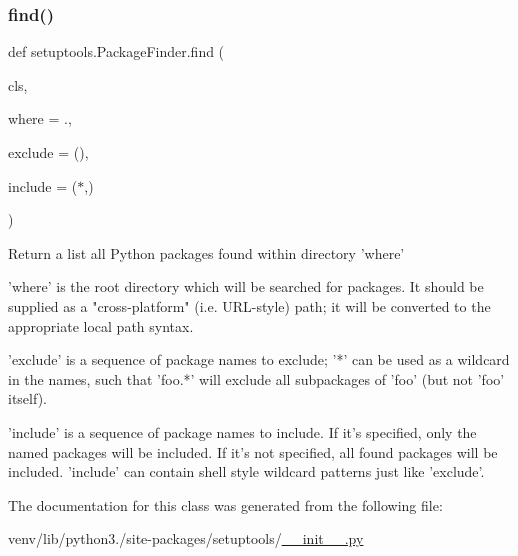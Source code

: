 \subsubsection{\texorpdfstring{find()}{find()}}
{\footnotesize\ttfamily def setuptools.\+Package\+Finder.\+find (\begin{DoxyParamCaption}\item[{}]{cls,  }\item[{}]{where = {\ttfamily \textquotesingle{}.\textquotesingle{}},  }\item[{}]{exclude = {\ttfamily ()},  }\item[{}]{include = {\ttfamily (\textquotesingle{}$\ast$\textquotesingle{},)} }\end{DoxyParamCaption})}

\begin{DoxyVerb}Return a list all Python packages found within directory 'where'

'where' is the root directory which will be searched for packages.  It
should be supplied as a "cross-platform" (i.e. URL-style) path; it will
be converted to the appropriate local path syntax.

'exclude' is a sequence of package names to exclude; '*' can be used
as a wildcard in the names, such that 'foo.*' will exclude all
subpackages of 'foo' (but not 'foo' itself).

'include' is a sequence of package names to include.  If it's
specified, only the named packages will be included.  If it's not
specified, all found packages will be included.  'include' can contain
shell style wildcard patterns just like 'exclude'.
\end{DoxyVerb}
 

The documentation for this class was generated from the following file\+:\begin{DoxyCompactItemize}
\item 
venv/lib/python3./site-\/packages/setuptools/\hyperlink{venv_2lib_2python3_89_2site-packages_2setuptools_2____init_____8py}{\+\_\+\+\_\+init\+\_\+\+\_\+.\+py}\end{DoxyCompactItemize}
